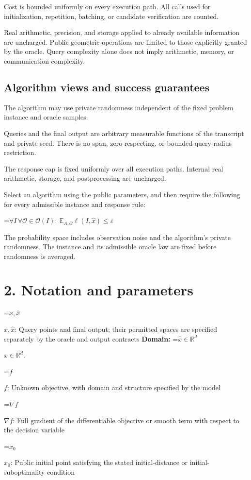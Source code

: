 \documentclass[10pt,a4paper]{article}
\newcommand{\AtlasMath}[1]{\par\begingroup\centering\setbox0=\hbox{$\displaystyle #1$}\ifdim\wd0>1.4\linewidth\typeout{ATLAS WIDE FORMULA: \the\wd0}\fi\ifdim\wd0>\linewidth\resizebox{\linewidth}{!}{\box0}\else\box0\fi\par\endgroup}
\newcommand{\AtlasInlineMath}[1]{\begingroup\setbox0=\hbox{$#1$}\ifdim\wd0>.4\linewidth\endgroup\AtlasMath{#1}\else\endgroup$#1$\fi}
\begin{document}
Cost is bounded uniformly on every execution path. All calls used for initialization, repetition, batching, or candidate verification are counted.

Real arithmetic, precision, and storage applied to already available information are uncharged. Public geometric operations are limited to those explicitly granted by the oracle. Query complexity alone does not imply arithmetic, memory, or communication complexity.

\subsection{Algorithm views and success guarantees}
The algorithm may use private randomness independent of the fixed problem instance and oracle samples.

Queries and the final output are arbitrary measurable functions of the transcript and private seed. There is no span, zero-respecting, or bounded-query-radius restriction.

The response cap is fixed uniformly over all execution paths. Internal real arithmetic, storage, and postprocessing are uncharged.

Select an algorithm using the public parameters, and then require the following for every admissible instance and response rule:


\AtlasMath{\forall I\,\forall\mathcal{O}\in\mathcal{O}(I):\ \mathbb{E}_{A,\mathcal{O}}\ell(I,\widehat{x})\le\varepsilon}


The probability space includes observation noise and the algorithm's private randomness. The instance and its admissible oracle law are fixed before randomness is averaged.

\section{2. Notation and parameters}
\AtlasInlineMath{x,\widehat{x}}: Query points and final output; their permitted spaces are specified separately by the oracle and output contracts \textbf{Domain:} \AtlasInlineMath{\widehat{x}\in \mathbb{R}^d}.

\AtlasInlineMath{f}: Unknown objective, with domain and structure specified by the model

\AtlasInlineMath{\nabla f}: Full gradient of the differentiable objective or smooth term with respect to the decision variable

\AtlasInlineMath{x_0}: Public initial point satisfying the stated initial-distance or initial-suboptimality condition
\end{document}

